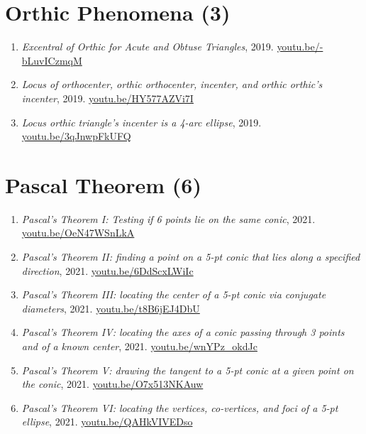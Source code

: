 \documentclass[12pt]{article}
\begin{document}
\section{Orthic Phenomena (3)}

\begin{enumerate}[resume]
\item \textit{Excentral of Orthic for Acute and Obtuse Triangles}, 2019. \href{https://youtu.be/-bLuvICzmqM}{\url{youtu.be/-bLuvICzmqM}}
\item \textit{Locus of orthocenter, orthic orthocenter, incenter, and orthic orthic's incenter}, 2019. \href{https://youtu.be/HY577AZVi7I}{\url{youtu.be/HY577AZVi7I}}
\item \textit{Locus orthic triangle's incenter is a 4-arc ellipse}, 2019. \href{https://youtu.be/3qJnwpFkUFQ}{\url{youtu.be/3qJnwpFkUFQ}}
\end{enumerate}

\section{Pascal Theorem (6)}

\begin{enumerate}[resume]
\item \textit{Pascal's Theorem I: Testing if 6 points lie on the same conic}, 2021. \href{https://youtu.be/OeN47WSnLkA}{\url{youtu.be/OeN47WSnLkA}}
\item \textit{Pascal's Theorem II: finding a point on a 5-pt conic that lies along a specified direction}, 2021. \href{https://youtu.be/6DdScxLWiIc}{\url{youtu.be/6DdScxLWiIc}}
\item \textit{Pascal's Theorem III: locating the center of a 5-pt conic via conjugate diameters}, 2021. \href{https://youtu.be/t8B6jEJ4DbU}{\url{youtu.be/t8B6jEJ4DbU}}
\item \textit{Pascal's Theorem IV: locating the axes of a conic passing through 3 points and of a known center}, 2021. \href{https://youtu.be/wnYPz_okdJc}{\url{youtu.be/wnYPz\_okdJc}}
\item \textit{Pascal's Theorem V: drawing the tangent to a 5-pt conic at a given point on the conic}, 2021. \href{https://youtu.be/O7x513NKAuw}{\url{youtu.be/O7x513NKAuw}}
\item \textit{Pascal's Theorem VI: locating the vertices, co-vertices, and foci of a 5-pt ellipse}, 2021. \href{https://youtu.be/QAHkVIVEDso}{\url{youtu.be/QAHkVIVEDso}}
\end{enumerate}
\end{document}
